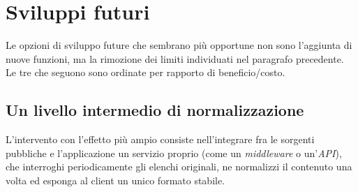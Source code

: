 %
%

\section{Sviluppi futuri}\label{sec:sviluppi-futuri}

Le opzioni di sviluppo future che sembrano più opportune non sono l'aggiunta di nuove funzioni, %
ma la rimozione dei limiti individuati nel paragrafo precedente.
Le tre che seguono sono ordinate per rapporto di beneficio/costo.%

\subsection{Un livello intermedio di normalizzazione}\label{subsec:futuro-backend}

L'intervento con l'effetto più ampio consiste nell'integrare fra le sorgenti pubbliche e l'applicazione un servizio
proprio (come un \textit{middleware} o un'\textit{API}), che interroghi periodicamente gli elenchi originali, ne normalizzi
il contenuto una volta ed esponga al client un unico formato stabile.

